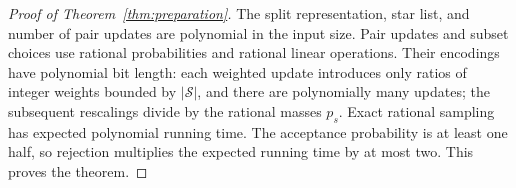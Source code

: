 \begin{proof}[Proof of Theorem~\ref{thm:preparation}]
The split representation, star list, and number of pair updates are
polynomial in the input size.  Pair updates and subset choices use
rational probabilities and rational linear operations.  Their
encodings have polynomial bit length: each weighted update introduces
only ratios of integer weights bounded by $|\mathcal S|$, and there
are polynomially many updates; the subsequent rescalings divide by
the rational masses $p_s$.  Exact rational sampling has expected
polynomial running time.  The acceptance probability is at least
one half, so rejection multiplies the expected running time by at
most two.  This proves the theorem.
\end{proof}
